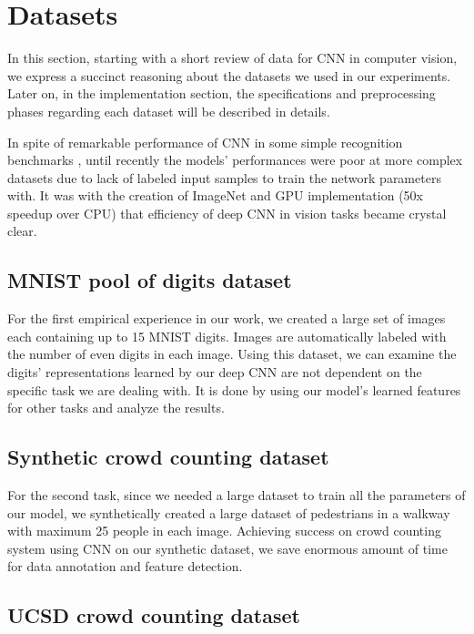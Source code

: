 \section{Datasets} 

In this section, starting with a short review of data for CNN in computer vision, we express a succinct reasoning about the datasets we used in our experiments. Later on, in the implementation section, the specifications and preprocessing phases regarding each dataset will be described in details. 

In spite of remarkable  performance of CNN in some simple recognition benchmarks \cite{cirecsan2011convolutional, ciresan2015multi, wan2013regularization, cirecsan2012multi}, until recently the models' performances were poor at more complex datasets \cite{griffin2007caltech} due to lack of labeled input samples to train the network parameters with. It was with the creation of ImageNet\cite{deng2009imagenet} and GPU implementation\cite{krizhevsky2012imagenet} (50x speedup over CPU) that efficiency of deep CNN in vision tasks became crystal clear.

\subsection{MNIST pool of digits dataset}

For the first empirical experience in our work, we created a large set of images each containing up to 15 MNIST digits. Images are automatically labeled with the number of even digits in each image. Using this dataset, we can examine the digits' representations learned by our deep CNN are not dependent on the specific task we are dealing with. It is done by using our model's learned features for other tasks and analyze the results. 

\subsection{Synthetic crowd counting dataset}

For the second task, since we needed a large dataset to train all the parameters of our model, we synthetically created a large dataset of pedestrians in a walkway with maximum 25 people in each image. Achieving success on crowd counting system using CNN on our synthetic dataset, we save enormous amount of time for data annotation and feature detection. 

\subsection{UCSD crowd counting dataset}

